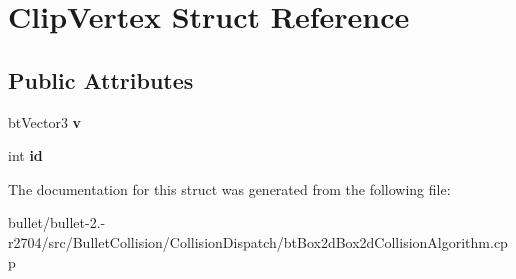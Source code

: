 \hypertarget{struct_clip_vertex}{\section{Clip\+Vertex Struct Reference}
\label{struct_clip_vertex}
}
\subsection*{Public Attributes}
\begin{DoxyCompactItemize}
\item 
\hypertarget{struct_clip_vertex_aef0ba87278279d173dca2bc61df03f56}{bt\+Vector3 {\bfseries v}}\label{struct_clip_vertex_aef0ba87278279d173dca2bc61df03f56}

\item 
\hypertarget{struct_clip_vertex_af1c55f4364142bb535e84db13c7eb632}{int {\bfseries id}}\label{struct_clip_vertex_af1c55f4364142bb535e84db13c7eb632}

\end{DoxyCompactItemize}


The documentation for this struct was generated from the following file\+:\begin{DoxyCompactItemize}
\item 
bullet/bullet-\/2.-\/r2704/src/\+Bullet\+Collision/\+Collision\+Dispatch/bt\+Box2d\+Box2d\+Collision\+Algorithm.\+cpp\end{DoxyCompactItemize}

